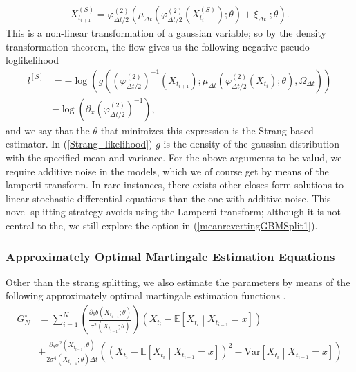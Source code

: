 \begin{align}
    X_{t_{i+1}}^{(S)} = \varphi_{\Delta t / 2}^{(2)}\left(\mu_{\Delta t}\left(\varphi_{\Delta t/2}^{(2)}\left(X_{t_{i}}^{(S)}\right); \theta\right) + \xi_{\Delta t} \; ; \theta \right). \label{eq:classicStrangSplitting}
\end{align}
This is a non-linear transformation of a gaussian variable; so by the density transformation theorem, the flow gives us the following negative pseudo-loglikelihood 
\begin{align}
    l^{[S]} &= -\log\left(g\left(\left(\varphi_{\Delta t / 2}^{(2)}\right)^{-1}\left(X_{t_{i+1}}\right); \mu_{\Delta t}\left(\varphi_{\Delta t/2}^{(2)}\left(X_{t_{i}}\right); \theta \right), \Omega_{\Delta t} \right) \right) \nonumber \\
    &- \log\left(\partial_x \left(\varphi_{\Delta t / 2}^{(2)}\right)^{-1} \right), \label{Strang_likelihood}
\end{align}
and we say that the $\theta$ that minimizes this expression is the Strang-based estimator. In (\ref{Strang_likelihood}) $g$ is the density of the gaussian distribution with the specified mean and variance. For the above arguments to be valud, we require additive noise in the models, which we of course get by means of the lamperti-transform. In rare instances, there exists other closes form solutions to linear stochastic differential equations than the one with additive noise. This novel splitting strategy avoids using the Lamperti-transform; although it is not central to the, we still explore the option in (\ref{meanrevertingGBMSplit1}).
\subsubsection{Approximately Optimal Martingale Estimation Equations}\label{subsubsec:approximatelyOptimalMartingaleEstimationEquation}
Other than the strang splitting, we also estimate the parameters by means of the following approximately optimal martingale estimation functions \cite[Example 1.11]{StatisticalMethodsForSDE}.
\begin{align}
    G_N^{\circ} &= \sum_{i = 1}^N 
    \left(
        \frac{\partial_\theta b\left(X_{t_{i-1}};\theta\right)}{\sigma^2\left(X_{t_{i-1}};\theta\right)}
    \right) \left(X_{t_{i}} - \mathbb{E}\left[X_{t_{i}} \middle| X_{t_{i-1}} = x\right]\right) \nonumber \\
    &+ \frac{\partial_\theta\sigma^2\left(X_{t_{i-1}}; \theta\right)}{2\sigma^4\left(X_{t_{i - 1}}; \theta\right)\Delta t}\left(\left(X_{t_{i}} - \mathbb{E}\left[X_{t_{i}} \middle| X_{t_{i-1}} = x\right]\right)^2 - \textrm{Var}\left[X_{t_{i}} \middle| X_{t_{i-1}} = x\right]\right) \label{eq:approximatelyOptimalMartingale}
\end{align}

